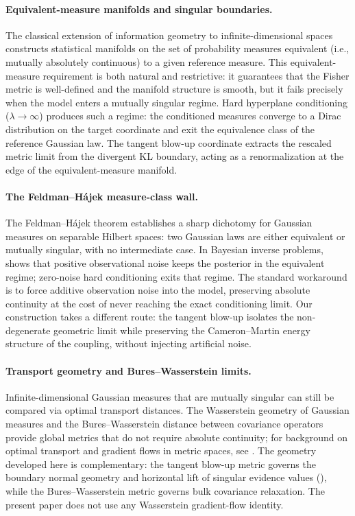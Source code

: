 \documentclass[11pt]{amsart}
\theoremstyle{plain}
\theoremstyle{definition}
\theoremstyle{remark}
\begin{document}
    \paragraph{Equivalent-measure manifolds and singular boundaries.}
    The classical extension of information geometry to infinite-dimensional spaces \cite{amari2000methods,pistone1995infinite,newton2012infinite} constructs statistical manifolds on the set of probability measures equivalent (i.e., mutually absolutely continuous) to a given reference measure. This equivalent-measure requirement is both natural and restrictive: it guarantees that the Fisher metric is well-defined and the manifold structure is smooth, but it fails precisely when the model enters a mutually singular regime. Hard hyperplane conditioning ($\lambda \to \infty$) produces such a regime: the conditioned measures converge to a Dirac distribution on the target coordinate and exit the equivalence class of the reference Gaussian law. The tangent blow-up coordinate extracts the rescaled metric limit from the divergent KL boundary, acting as a renormalization at the edge of the equivalent-measure manifold.

    \paragraph{The Feldman--H\'{a}jek measure-class wall.}
    The Feldman--H\'{a}jek theorem \cite{feldman1958equivalence,hajek1958property,bogachev1998gaussian} establishes a sharp dichotomy for Gaussian measures on separable Hilbert spaces: two Gaussian laws are either equivalent or mutually singular, with no intermediate case. In Bayesian inverse problems, \cite{stuart2010inverse} shows that positive observational noise keeps the posterior in the equivalent regime; zero-noise hard conditioning exits that regime. The standard workaround is to force additive observation noise into the model, preserving absolute continuity at the cost of never reaching the exact conditioning limit. Our construction takes a different route: the tangent blow-up isolates the non-degenerate geometric limit while preserving the Cameron--Martin energy structure of the coupling, without injecting artificial noise.

    \paragraph{Transport geometry and Bures--Wasserstein limits.}
    Infinite-dimensional Gaussian measures that are mutually singular can still be compared via optimal transport distances. The Wasserstein geometry of Gaussian measures \cite{takatsu2011wasserstein} and the Bures--Wasserstein distance between covariance operators \cite{bhatia2019bures} provide global metrics that do not require absolute continuity; for background on optimal transport and gradient flows in metric spaces, see \cite{villani2009optimal}. The geometry developed here is complementary: the tangent blow-up metric governs the boundary normal geometry and horizontal lift of singular evidence values (), while the Bures--Wasserstein metric governs bulk covariance relaxation. The present paper does not use any Wasserstein gradient-flow identity.
\end{document}
